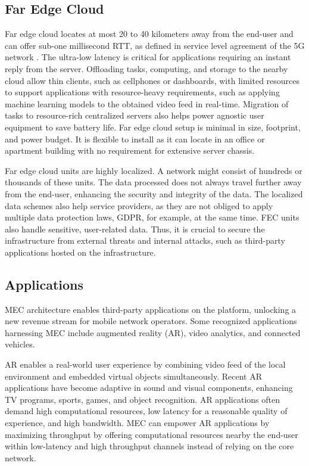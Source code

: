 \subsection{Far Edge Cloud}

Far edge cloud locates at most 20 to 40 kilometers away from the end-user and can offer sub-one millisecond RTT, as defined in service level agreement of the 5G network \cite{Parvez2018}. The ultra-low latency is critical for applications requiring an instant reply from the server. Offloading tasks, computing, and storage to the nearby cloud allow thin clients, such as cellphones or dashboards, with limited resources to support applications with resource-heavy requirements, such as applying machine learning models to the obtained video feed in real-time. Migration of tasks to resource-rich centralized servers also helps power agnostic user equipment to save battery life. Far edge cloud setup is minimal in size, footprint, and power budget. It is flexible to install as it can locate in an office or apartment building with no requirement for extensive server chassis. \cite{AirFrameOpenEdgeServer}

Far edge cloud units are highly localized. A network might consist of hundreds or thousands of these units. The data processed does not always travel further away from the end-user, enhancing the security and integrity of the data. The localized data schemes also help service providers, as they are not obliged to apply multiple data protection laws, GDPR, for example, at the same time. FEC units also handle sensitive, user-related data. Thus, it is crucial to secure the infrastructure from external threats and internal attacks, such as third-party applications hosted on the infrastructure.

\subsection{Applications}
\label{subs:applications}

MEC architecture enables third-party applications on the platform, unlocking a new revenue stream for mobile network operators. Some recognized applications harnessing MEC include augmented reality (AR), video analytics, and connected vehicles.

AR enables a real-world user experience by combining video feed of the local environment and embedded virtual objects simultaneously. Recent AR applications have become adaptive in sound and visual components, enhancing TV programs, sports, games, and object recognition. AR applications often demand high computational resources, low latency for a reasonable quality of experience, and high bandwidth. MEC can empower AR applications by maximizing throughput by offering computational resources nearby the end-user within low-latency and high throughput channels instead of relying on the core network. \cite{Abbas2018}

